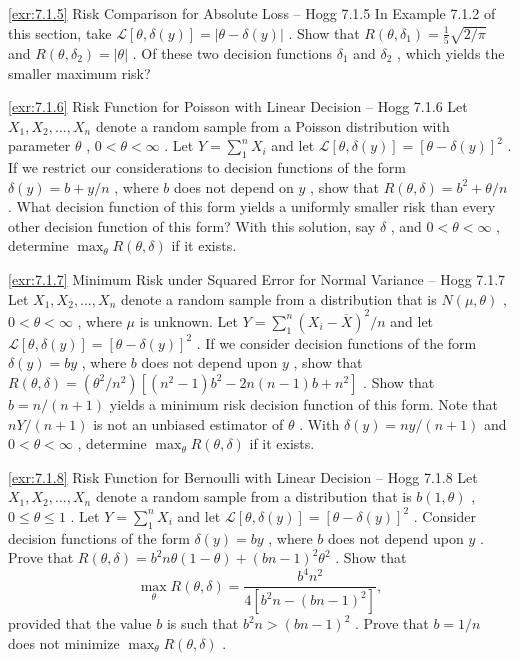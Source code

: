 \begin{exercise}{\ref{exr:7.1.5} Risk Comparison for Absolute Loss – Hogg 7.1.5}\label{exr:7.1.5}
In Example 7.1.2 of this section, take $\mathcal{L}[\theta, \delta(y)] = |\theta - \delta(y)|$ . Show that $R(\theta, \delta_1) = \frac{1}{5}\sqrt{2/\pi}$ and $R(\theta, \delta_2) = |\theta|$ . Of these two decision functions $\delta_1$ and $\delta_2$ , which yields the smaller maximum risk?
\end{exercise}

\begin{exercise}{\ref{exr:7.1.6} Risk Function for Poisson with Linear Decision – Hogg 7.1.6}\label{exr:7.1.6}
Let $X_{1}, X_{2}, \ldots, X_{n}$ denote a random sample from a Poisson distribution with parameter $\theta$ , $0 < \theta < \infty$ . Let $Y = \sum_{1}^{n} X_{i}$ and let $\mathcal{L}[\theta, \delta(y)] = [\theta - \delta(y)]^2$ . If we restrict our considerations to decision functions of the form $\delta(y) = b + y/n$ , where $b$ does not depend on $y$ , show that $R(\theta, \delta) = b^2 + \theta / n$ . What decision function of this form yields a uniformly smaller risk than every other decision function of this form? With this solution, say $\delta$ , and $0 < \theta < \infty$ , determine $\max_{\theta} R(\theta, \delta)$ if it exists.
\end{exercise}

\begin{exercise}{\ref{exr:7.1.7} Minimum Risk under Squared Error for Normal Variance – Hogg 7.1.7}\label{exr:7.1.7}
Let $X_{1}, X_{2}, \ldots, X_{n}$ denote a random sample from a distribution that is $N(\mu, \theta)$ , $0 < \theta < \infty$ , where $\mu$ is unknown. Let $Y = \sum_{1}^{n}(X_{i} - \overline{X})^{2} / n$ and let $\mathcal{L}[\theta, \delta(y)] = [\theta - \delta(y)]^{2}$ . If we consider decision functions of the form $\delta(y) = by$ , where $b$ does not depend upon $y$ , show that $R(\theta, \delta) = (\theta^{2} / n^{2})[(n^{2} - 1)b^{2} - 2n(n - 1)b + n^{2}]$ . Show that $b = n / (n + 1)$ yields a minimum risk decision function of this form. Note that $nY / (n + 1)$ is not an unbiased estimator of $\theta$ . With $\delta(y) = ny / (n + 1)$ and $0 < \theta < \infty$ , determine $\max_{\theta} R(\theta, \delta)$ if it exists.
\end{exercise}

\begin{exercise}{\ref{exr:7.1.8} Risk Function for Bernoulli with Linear Decision – Hogg 7.1.8}\label{exr:7.1.8}
Let $X_{1}, X_{2}, \ldots, X_{n}$ denote a random sample from a distribution that is $b(1, \theta)$ , $0 \leq \theta \leq 1$ . Let $Y = \sum_{1}^{n} X_{i}$ and let $\mathcal{L}[\theta, \delta(y)] = [\theta - \delta(y)]^2$ . Consider decision functions of the form $\delta(y) = by$ , where $b$ does not depend upon $y$ . Prove that $R(\theta, \delta) = b^2 n\theta (1 - \theta) + (bn - 1)^2\theta^2$ . Show that
\[
\max _{\theta} R(\theta, \delta) = \frac{b^4 n^2}{4[b^2 n - (bn - 1)^2]},
\]
provided that the value $b$ is such that $b^{2}n > (bn - 1)^{2}$ . Prove that $b = 1 / n$ does not minimize $\max_{\theta} R(\theta, \delta)$ .
\end{exercise}

